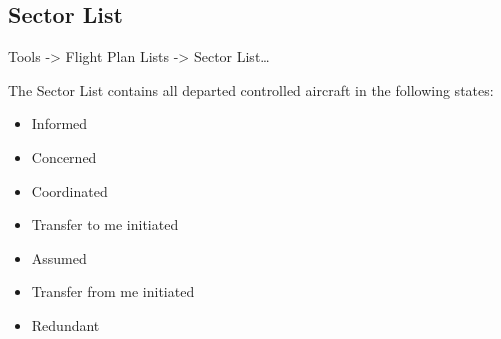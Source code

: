 \documentclass[a4paper,oneside,11pt]{memoir}
\begin{document}
\subsection{Sector List}
\label{list:sector}

 Tools -> Flight Plan Lists -> Sector List…

The Sector List contains all departed controlled aircraft in the following states:

\bigskip

\begin{itemize}
    \item Informed\footnotemark[1]
    \item Concerned\footnotemark[1]\footnotemark[2]
    \item Coordinated
    \item Transfer to me initiated
    \item Assumed
    \item Transfer from me initiated
    \item Redundant\footnotemark[1]
\end{itemize}


\end{document}
